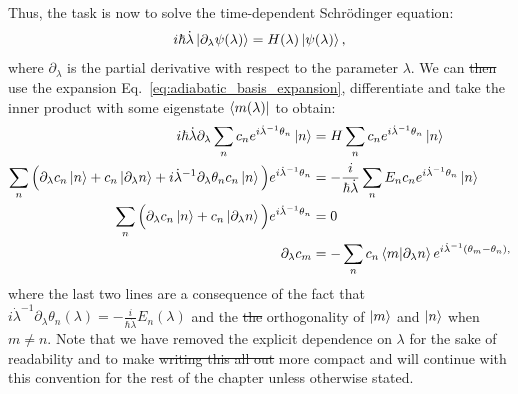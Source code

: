 \documentclass[a4paper,oneside,11pt]{book}
\newcommand{\dlambda}{\partial_{\lambda}}
\newcommand{\dotlambda}{\dot{\lambda}}
\providecommand{\DIFaddtex}[1]{{\protect\color{blue}\uwave{#1}}} %
\providecommand{\DIFdeltex}[1]{{\protect\color{red}\sout{#1}}}                      %
\providecommand{\DIFaddbegin}{} %
\providecommand{\DIFaddend}{} %
\providecommand{\DIFdelbegin}{} %
\providecommand{\DIFdelend}{} %
\providecommand{\DIFadd}[1]{\texorpdfstring{\DIFaddtex{#1}}{#1}} %
\providecommand{\DIFdel}[1]{\texorpdfstring{\DIFdeltex{#1}}{}} %
\newcommand{\DIFscaledelfig}{0.5}
\newlength{\DIFdelgraphicswidth} %
\newlength{\DIFdelgraphicsheight} %
\newcommand{\DIFaddincludegraphics}[2][]{{\color{blue}\fbox{\DIFOincludegraphics[#1]{#2}}}} %
\newcommand{\DIFdelincludegraphics}[2][]{%
\sbox{\DIFdelgraphicsbox}{\DIFOincludegraphics[#1]{#2}}%
\settoboxwidth{\DIFdelgraphicswidth}{\DIFdelgraphicsbox} %
\settoboxtotalheight{\DIFdelgraphicsheight}{\DIFdelgraphicsbox} %
\scalebox{\DIFscaledelfig}{%
\parbox[b]{\DIFdelgraphicswidth}{\usebox{\DIFdelgraphicsbox}\\[-\baselineskip] \rule{\DIFdelgraphicswidth}{0em}}\llap{\resizebox{\DIFdelgraphicswidth}{\DIFdelgraphicsheight}{%
\setlength{\unitlength}{\DIFdelgraphicswidth}%
\begin{picture}(1,1)%
\thicklines\linethickness{2pt} %
{\color[rgb]{1,0,0}\put(0,0){\framebox(1,1){}}}%
{\color[rgb]{1,0,0}\put(0,0){\line( 1,1){1}}}%
{\color[rgb]{1,0,0}\put(0,1){\line(1,-1){1}}}%
\end{picture}%
}\hspace*{3pt}}} %
} %
\DeclareRobustCommand{\DIFaddbegin}{\DIFOaddbegin \let\includegraphics\DIFaddincludegraphics} %
\DeclareRobustCommand{\DIFaddend}{\DIFOaddend \let\includegraphics\DIFOincludegraphics} %
\DeclareRobustCommand{\DIFdelbegin}{\DIFOdelbegin \let\includegraphics\DIFdelincludegraphics} %
\DeclareRobustCommand{\DIFdelend}{\DIFOaddend \let\includegraphics\DIFOincludegraphics} %
\begin{document}
    Thus, the task is now to solve the time-dependent Schr\"{o}dinger equation:
    \begin{equation}\label{eq:td-schroedinger}
        i\hbar \dotlambda \ket{\dlambda \psi(\lambda)} = H(\lambda) \ket{\psi(\lambda)},
    \end{equation}
    where $\dlambda$ is the partial derivative with respect to the parameter $\lambda$. We can \DIFdelbegin \DIFdel{then }\DIFdelend use the expansion Eq.~\eqref{eq:adiabatic_basis_expansion}, differentiate and take the inner product with some eigenstate $\bra{m(\lambda)}$ to obtain:
    \begin{equation}\label{eq:adiabatic_derivation}
        \begin{aligned}
         i\hbar \dotlambda \dlambda \sum_n c_n e^{i \dotlambda^{-1} \theta_n} \ket{n} &= H \sum_n c_n e^{i \dotlambda^{-1} \theta_n} \ket{n} \\
        \sum_n \Big( \dlambda c_n \ket{n} + c_n \ket{\dlambda n} + i \dotlambda^{-1} \dlambda\theta_n c_n \ket{n} \Big)e^{i \dotlambda^{-1} \theta_n} &= -\frac{i}{\hbar \dotlambda} \sum_n E_n c_n e^{i \dotlambda^{-1} \theta_n} \ket{n} \\
        \sum_n \Big( \dlambda c_n \ket{n} + c_n \ket{\dlambda n} \Big)e^{i \dotlambda^{-1} \theta_n} &= 0 \\
        \dlambda c_m  &= - \sum_n c_n \braket{m}{\dlambda n}e^{i\dotlambda^{-1}(\theta_m-\theta_n),}
        \end{aligned}
    \end{equation}
    where the last two lines are a consequence of the fact that $i \dotlambda^{-1} \dlambda \theta_n(\lambda) = -\frac{i}{\hbar \dotlambda} E_n(\lambda)$ and the \DIFdelbegin \DIFdel{the }\DIFdelend orthogonality of $\ket{m}$ and $\ket{n}$ when $m \neq n$. Note that we have removed the explicit dependence on $\lambda$ for the sake of readability and to make \DIFdelbegin \DIFdel{writing this all out }\DIFdelend \DIFaddbegin \DIFadd{the writing }\DIFaddend more compact and will continue with this convention for the rest of the chapter unless otherwise stated. 
\end{document}
